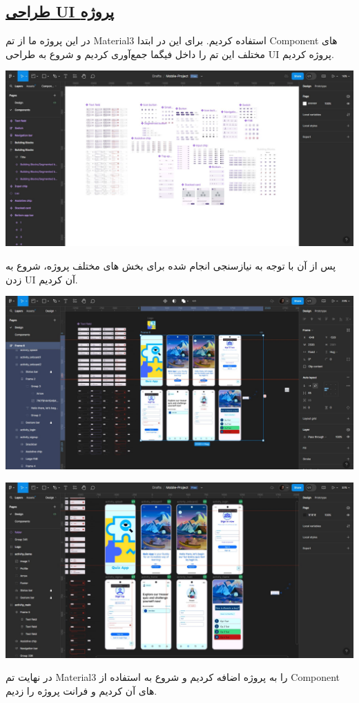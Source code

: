 \subsection*{\underline{طراحی UI پروژه}}

در این پروژه ما از تم Material3 استفاده کردیم. برای این در ابتدا Component های مختلف این تم را داخل فیگما جمع‌آوری کردیم و شروع به طراحی UI پروژه کردیم.



\includegraphics[width=1\linewidth]{figs/1}




پس از آن با توجه به نیازسنجی انجام شده برای بخش های مختلف پروژه، شروع به زدن UI آن کردیم.


\includegraphics[width=1\linewidth]{figs/2}

\includegraphics[width=1\linewidth]{figs/3}

در نهایت تم Material3 را به پروژه اضافه کردیم و شروع به استفاده از Component های آن کردیم و فرانت پروژه را زدیم.